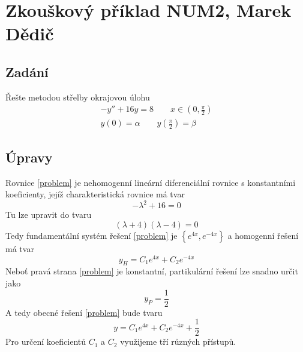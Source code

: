 \documentclass[a4paper]{article}
\begin{document}
\section*{Zkouškový příklad NUM2, Marek Dědič}

\subsection*{Zadání}
Řešte metodou střelby okrajovou úlohu
\begin{subequations}\label{input}
	\begin{align}
		-y'' + 16y = 8 \qquad x \in \left( 0, \frac{\pi}{2} \right) \label{problem} \\
		y \left( 0 \right) = \alpha \qquad y \left( \frac{\pi}{2} \right) = \beta \label{boundary}
	\end{align}
\end{subequations}

\subsection*{Úpravy}
Rovnice \eqref{problem} je nehomogenní lineární diferenciální rovnice s konstantními koeficienty, jejíž charakteristická rovnice má tvar
\begin{equation}\label{chareq1}
	- \lambda^2 + 16 = 0
\end{equation}
Tu lze upravit do tvaru
\begin{equation}\label{chareq2}
	\left( \lambda + 4 \right) \left( \lambda - 4 \right) = 0
\end{equation}
Tedy fundamentální systém řešení \eqref{problem} je \( \left\{ e^{ 4x }, e^{ -4x } \right\} \) a homogenní řešení má tvar
\begin{equation}\label{homogeneous}
	y_H = C_1 e^{ 4x } + C_2 e^{ -4x }
\end{equation}
Neboť pravá strana \eqref{problem} je konstantní, partikulární řešení lze snadno určit jako
\begin{equation}\label{particular}
	y_P = \frac{1}{2}
\end{equation}
A tedy obecné řešení \eqref{problem} bude tvaru
\begin{equation}\label{solution}
	y = C_1 e^{ 4x } + C_2 e^{ -4x } + \frac{1}{2}
\end{equation}
Pro určení koeficientů \( C_1 \) a \( C_2 \) využijeme tří různých přístupů.
\end{document}
